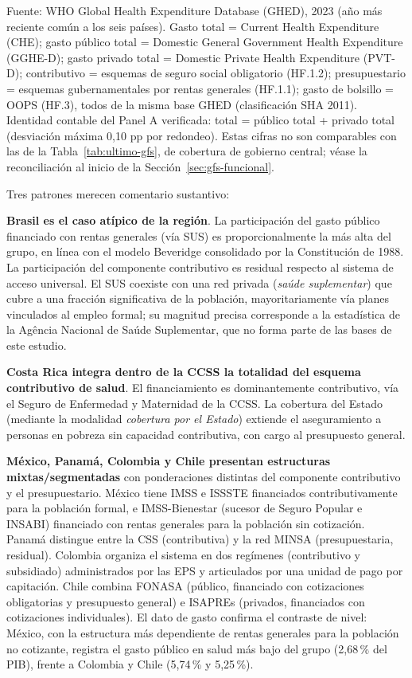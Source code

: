\documentclass[12pt, letterpaper]{article}
\begin{document}
\begin{table}[h!]
\smallskip
\footnotesize
Fuente: WHO Global Health Expenditure Database (GHED), 2023 (año más reciente común a
los seis países). Gasto total = Current Health Expenditure (CHE); gasto público total
= Domestic General Government Health Expenditure (GGHE-D); gasto privado total =
Domestic Private Health Expenditure (PVT-D); contributivo = esquemas de seguro social
obligatorio (HF.1.2); presupuestario = esquemas gubernamentales por rentas generales
(HF.1.1); gasto de bolsillo = OOPS (HF.3), todos de la misma base GHED (clasificación
SHA 2011). Identidad contable del Panel A verificada: total = público total + privado
total (desviación máxima 0{,}10 pp por redondeo). Estas cifras no son comparables con
las de la Tabla~\ref{tab:ultimo-gfs}, de cobertura de gobierno central; véase la
reconciliación al inicio de la Sección~\ref{sec:gfs-funcional}.
\end{table}

Tres patrones merecen comentario sustantivo:

\textbf{Brasil es el caso atípico de la región}. La participación del gasto público
financiado con rentas generales (vía SUS) es proporcionalmente la más alta del
grupo, en línea con el modelo Beveridge consolidado por la Constitución de 1988.
La participación del componente contributivo es residual respecto al sistema de
acceso universal. El SUS coexiste con una red privada (\textit{saúde suplementar})
que cubre a una fracción significativa de la población, mayoritariamente vía planes
vinculados al empleo formal; su magnitud precisa corresponde a la estadística de la
Agência Nacional de Saúde Suplementar, que no forma parte de las bases de este
estudio.

\textbf{Costa Rica integra dentro de la CCSS la totalidad del esquema contributivo
de salud}. El financiamiento es dominantemente contributivo, vía el Seguro de
Enfermedad y Maternidad de la CCSS. La cobertura del Estado (mediante la modalidad
\textit{cobertura por el Estado}) extiende el aseguramiento a personas en pobreza
sin capacidad contributiva, con cargo al presupuesto general.

\textbf{México, Panamá, Colombia y Chile presentan estructuras
mixtas/segmentadas} con ponderaciones distintas del componente contributivo y el
presupuestario. México tiene IMSS e ISSSTE financiados contributivamente para la
población formal, e IMSS-Bienestar (sucesor de Seguro Popular e INSABI) financiado
con rentas generales para la población sin cotización. Panamá distingue entre la
CSS (contributiva) y la red MINSA (presupuestaria, residual). Colombia organiza el
sistema en dos regímenes (contributivo y subsidiado) administrados por las EPS y
articulados por una unidad de pago por capitación. Chile combina FONASA (público,
financiado con cotizaciones obligatorias y presupuesto general) e ISAPREs
(privados, financiados con cotizaciones individuales). El dato de gasto confirma el
contraste de nivel: México, con la estructura más dependiente de rentas generales
para la población no cotizante, registra el gasto público en salud más bajo del
grupo (2{,}68\,\% del PIB), frente a Colombia y Chile (5{,}74\,\% y 5{,}25\,\%).
\end{document}
